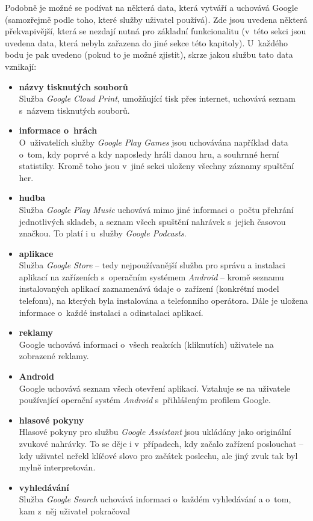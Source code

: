 Podobně je možné se podívat na některá data, která vytváří a uchovává Google (samozřejmě podle toho, které služby uživatel používá). Zde jsou uvedena některá překvapivější, která se nezdají nutná pro základní funkcionalitu (v~této sekci jsou uvedena data, která nebyla zařazena do jiné sekce této kapitoly).
U~každého bodu je pak uvedeno (pokud to je možné zjistit), skrze jakou službu tato data vznikají:

\begin{itemize}
	\item \textbf{názvy tisknutých souborů}\\
	Služba \textit{Google Cloud Print}, umožňující tisk přes internet, uchovává seznam s~názvem tisknutých souborů.

	\item \textbf{informace o~hrách}\\
	O~uživatelích služby \textit{Google Play Games} jsou uchovávána například data o~tom, kdy poprvé a kdy naposledy hráli danou hru, a souhrnné herní statistiky. Kromě toho jsou v~jiné sekci uloženy všechny záznamy spuštění her. 

	\item \textbf{hudba}\\
	Služba \textit{Google Play Music} uchovává mimo jiné informaci o~počtu přehrání jednotlivých skladeb, a seznam všech spuštění nahrávek s~jejich časovou značkou. To platí i u~služby \textit{Google Podcasts}.

	\item \textbf{aplikace}\\
	Služba \textit{Google Store} -- tedy nejpoužívanější služba pro správu a instalaci aplikací na zařízeních s~operačním systémem \textit{Android} -- kromě seznamu instalovaných aplikací zaznamenává údaje o~zařízení (konkrétní model telefonu), na kterých byla instalována a telefonního operátora. Dále je uložena informace o~každé instalaci a odinstalaci aplikací.
	
	\item \textbf{reklamy}\\
	Google uchovává informaci o~všech reakcích (kliknutích) uživatele na zobrazené reklamy.

	\item \textbf{Android}\\
	Google uchovává seznam všech otevření aplikací. Vztahuje se na uživatele používající operační systém \textit{Android} s~přihlášeným profilem Google. 

	\item \textbf{hlasové pokyny}\\
	Hlasové pokyny pro službu \textit{Google Assistant} jsou ukládány jako originální zvukové nahrávky. To se děje i v~případech, kdy začalo zařízení poslouchat  -- kdy uživatel neřekl klíčové slovo pro začátek poslechu, ale jiný zvuk tak byl mylně interpretován. 

	\item \textbf{vyhledávání}\\
	Služba \textit{Google Search} uchovává informaci o~každém vyhledávání a o~tom, kam z~něj uživatel pokračoval
\end{itemize}


